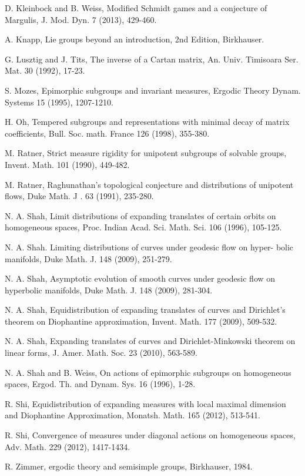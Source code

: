 \documentclass[12pt]{amsart}
\theoremstyle{definition}
\theoremstyle{remark}
\numberwithin{equation}{section}
\begin{document}
\begin{thebibliography}{99}
D. Kleinbock and B. Weiss, Modified Schmidt games and a conjecture of Margulis, 
J. Mod. Dyn. 7 (2013), 429-460.

 A. Knapp, Lie groups beyond an introduction, 2nd Edition, Birkhauser. 
 
G. Lusztig and J. Tits, The inverse of a Cartan matrix, An. Univ. Timisoara Ser. Mat. 30 (1992), 17-23. 
 
S. Mozes, Epimorphic subgroups and invariant measures, 
Ergodic Theory Dynam. Systems 15 (1995), 1207-1210.

H. Oh, Tempered subgroups and representations with minimal decay of matrix coefficients, 
Bull. Soc. math. France 126 (1998), 355-380.

M. Ratner, Strict measure rigidity for unipotent subgroups of solvable groups, Invent. Math. 101
(1990), 449-482.

M. Ratner, Raghunathan's topological conjecture and distributions of unipotent flows, Duke
Math. J . 63 (1991), 235-280.

N. A. Shah, Limit distributions of expanding translates of certain orbits on homogeneous
spaces, Proc. Indian Acad. Sci. Math. Sci. 106 (1996), 105-125.

N. A. Shah. Limiting distributions of curves under geodesic flow on hyper-
bolic manifolds, Duke Math. J. 148 (2009), 251-279.

N. A. Shah, Asymptotic evolution of smooth curves under geodesic flow on
hyperbolic manifolds, Duke Math. J. 148 (2009), 281-304.

N. A. Shah, Equidistribution of expanding translates of curves and Dirichlet's
theorem on Diophantine approximation, Invent. Math. 177 (2009), 509-532.

N. A. Shah, Expanding translates of curves and Dirichlet-Minkowski theorem 
on linear forms, J. Amer. Math. Soc. 23 (2010), 563-589.

N. A. Shah and B. Weiss, On actions of epimorphic subgroups on homogeneous spaces, Ergod. Th. and Dynam. 
Sys. 16 (1996), 1-28.

R. Shi, Equidistribution of expanding measures with local maximal dimension and Diophantine
Approximation, Monatsh. Math.  165 (2012), 513-541.

R. Shi, Convergence of measures under diagonal actions on homogeneous spaces, Adv. Math.
 229 (2012),  1417-1434.

R. Zimmer, ergodic theory and semisimple groups, Birkhauser, 1984.

\end{thebibliography}
\end{document}
